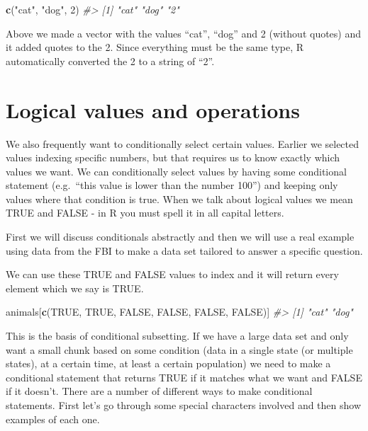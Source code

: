 \documentclass[
  12pt,
]{book}
\newenvironment{Shaded}{\begin{snugshade}}{\end{snugshade}}
\newcommand{\CommentTok}[1]{\textcolor[rgb]{0.56,0.35,0.01}{\textit{#1}}}
\newcommand{\DecValTok}[1]{\textcolor[rgb]{0.00,0.00,0.81}{#1}}
\newcommand{\KeywordTok}[1]{\textcolor[rgb]{0.13,0.29,0.53}{\textbf{#1}}}
\newcommand{\NormalTok}[1]{#1}
\newcommand{\OtherTok}[1]{\textcolor[rgb]{0.56,0.35,0.01}{#1}}
\newcommand{\StringTok}[1]{\textcolor[rgb]{0.31,0.60,0.02}{#1}}
\begin{document}
\begin{Shaded}
\begin{Highlighting}[]
\KeywordTok{c}\NormalTok{(}\StringTok{"cat"}\NormalTok{, }\StringTok{"dog"}\NormalTok{, }\DecValTok{2}\NormalTok{)}
\CommentTok{\#> [1] "cat" "dog" "2"}
\end{Highlighting}
\end{Shaded}

Above we made a vector with the values ``cat'', ``dog'' and 2 (without quotes) and it added quotes to the 2. Since everything must be the same type, R automatically converted the 2 to a string of ``2''.

\hypertarget{logical-values-and-operations}{%
\section{Logical values and operations}\label{logical-values-and-operations}}

We also frequently want to conditionally select certain values. Earlier we selected values indexing specific numbers, but that requires us to know exactly which values we want. We can conditionally select values by having some conditional statement (e.g.~``this value is lower than the number 100'') and keeping only values where that condition is true. When we talk about logical values we mean TRUE and FALSE - in R you must spell it in all capital letters.

First we will discuss conditionals abstractly and then we will use a real example using data from the FBI to make a data set tailored to answer a specific question.

We can use these TRUE and FALSE values to index and it will return every element which we say is TRUE.

\begin{Shaded}
\begin{Highlighting}[]
\NormalTok{animals[}\KeywordTok{c}\NormalTok{(}\OtherTok{TRUE}\NormalTok{, }\OtherTok{TRUE}\NormalTok{, }\OtherTok{FALSE}\NormalTok{, }\OtherTok{FALSE}\NormalTok{, }\OtherTok{FALSE}\NormalTok{, }\OtherTok{FALSE}\NormalTok{)]}
\CommentTok{\#> [1] "cat" "dog"}
\end{Highlighting}
\end{Shaded}

This is the basis of conditional subsetting. If we have a large data set and only want a small chunk based on some condition (data in a single state (or multiple states), at a certain time, at least a certain population) we need to make a conditional statement that returns TRUE if it matches what we want and FALSE if it doesn't. There are a number of different ways to make conditional statements. First let's go through some special characters involved and then show examples of each one.
\end{document}
